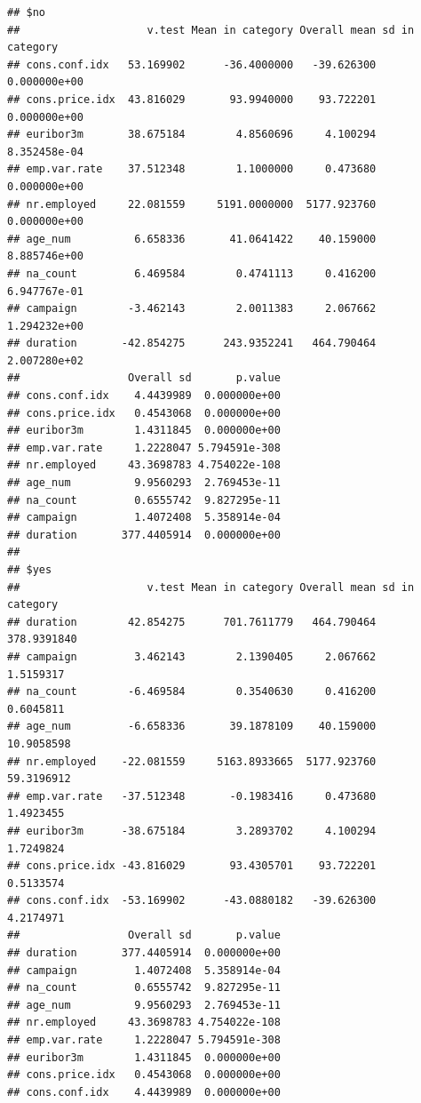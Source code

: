 \documentclass[
]{article}
\newenvironment{Shaded}{\begin{snugshade}}{\end{snugshade}}
\newcommand{\CommentTok}[1]{\textcolor[rgb]{0.56,0.35,0.01}{\textit{#1}}}
\newcommand{\NormalTok}[1]{#1}
\newcommand{\SpecialCharTok}[1]{\textcolor[rgb]{0.00,0.00,0.00}{#1}}
\begin{document}
\begin{verbatim}
## $no
##                    v.test Mean in category Overall mean sd in category
## cons.conf.idx   53.169902      -36.4000000   -39.626300   0.000000e+00
## cons.price.idx  43.816029       93.9940000    93.722201   0.000000e+00
## euribor3m       38.675184        4.8560696     4.100294   8.352458e-04
## emp.var.rate    37.512348        1.1000000     0.473680   0.000000e+00
## nr.employed     22.081559     5191.0000000  5177.923760   0.000000e+00
## age_num          6.658336       41.0641422    40.159000   8.885746e+00
## na_count         6.469584        0.4741113     0.416200   6.947767e-01
## campaign        -3.462143        2.0011383     2.067662   1.294232e+00
## duration       -42.854275      243.9352241   464.790464   2.007280e+02
##                 Overall sd       p.value
## cons.conf.idx    4.4439989  0.000000e+00
## cons.price.idx   0.4543068  0.000000e+00
## euribor3m        1.4311845  0.000000e+00
## emp.var.rate     1.2228047 5.794591e-308
## nr.employed     43.3698783 4.754022e-108
## age_num          9.9560293  2.769453e-11
## na_count         0.6555742  9.827295e-11
## campaign         1.4072408  5.358914e-04
## duration       377.4405914  0.000000e+00
## 
## $yes
##                    v.test Mean in category Overall mean sd in category
## duration        42.854275      701.7611779   464.790464    378.9391840
## campaign         3.462143        2.1390405     2.067662      1.5159317
## na_count        -6.469584        0.3540630     0.416200      0.6045811
## age_num         -6.658336       39.1878109    40.159000     10.9058598
## nr.employed    -22.081559     5163.8933665  5177.923760     59.3196912
## emp.var.rate   -37.512348       -0.1983416     0.473680      1.4923455
## euribor3m      -38.675184        3.2893702     4.100294      1.7249824
## cons.price.idx -43.816029       93.4305701    93.722201      0.5133574
## cons.conf.idx  -53.169902      -43.0880182   -39.626300      4.2174971
##                 Overall sd       p.value
## duration       377.4405914  0.000000e+00
## campaign         1.4072408  5.358914e-04
## na_count         0.6555742  9.827295e-11
## age_num          9.9560293  2.769453e-11
## nr.employed     43.3698783 4.754022e-108
## emp.var.rate     1.2228047 5.794591e-308
## euribor3m        1.4311845  0.000000e+00
## cons.price.idx   0.4543068  0.000000e+00
## cons.conf.idx    4.4439989  0.000000e+00
\end{verbatim}

\begin{Shaded}
\end{Shaded}
\end{document}
